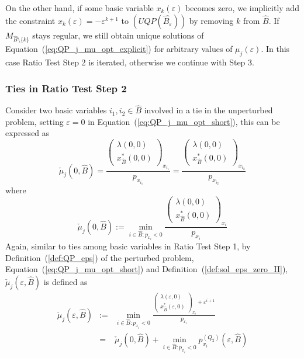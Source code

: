 \documentclass[a4paper]{article}
\newcommand{\xe}[1]{\ensuremath{x_{#1}(\varepsilon)}}
\begin{document}
On the other hand, if some basic variable \xe{k} becomes zero, we
implicitly add the constraint $\xe{k}=-\varepsilon^{k+1}$ to
$(UQP(\hat{B_{\varepsilon}}))$ by removing $k$ from $\hat{B}$. If
$M_{\hat{B} \setminus \{k\}}$ stays regular, we still obtain unique solutions
of Equation~(\ref{eq:QP_j_mu_opt_explicit}) for arbitrary values of
$\mu_{j}(\varepsilon)$. In this case Ratio Test Step 2 is iterated,
otherwise we continue with Step 3. 
 
\subsubsection{Ties in Ratio Test Step 2}
\label{sec:Ties_ratio_test_step_2}
Consider two basic variables $i_{1}, i_{2} \in \hat{B}$ involved in a tie in
the unperturbed problem, setting $\varepsilon=0$ in
Equation~(\ref{eq:QP_j_mu_opt_short}), this can be expressed as 
\begin{equation}
\check{\mu}_{j}(0, \hat{B}) =
\frac{\left(\begin{array}{c}
              \lambda\left(0,0\right) \\
              \hline
               x_{\hat{B}}^{*}\left(0,0\right)
            \end{array}
      \right)_{x_{i_{1}}}}{p_{x_{i_{1}}}}
=
\frac{\left(\begin{array}{c}
              \lambda\left(0,0\right) \\
              \hline
              x_{\hat{B}}^{*}\left(0,0\right) 
            \end{array}
       \right)_{x_{i_{2}}}}{p_{x_{i_{2}}}}
\end{equation}
where
\begin{equation}
\label{def:hat_mu_j_min_0}
  \check{\mu}_{j}(0, \hat{B}) :=
  \min_{i \in \hat{B}: p_{x_{i}} < 0}
  \frac{\left(\begin{array}{c}
                \lambda\left(0,0\right) \\
	        \hline
	        x_{\hat{B}}^{*}\left(0,0\right)
	       \end{array}
         \right)_{x_{i}}}{p_{x_{i}}} 
\end{equation}
Again, similar to ties among basic variables in Ratio Test Step 1,
by Definition~(\ref{def:QP_eps}) of the perturbed problem,
Equation~(\ref{eq:QP_j_mu_opt_short}) and
Definition~(\ref{def:sol_eps_zero_II}),
$\check{\mu}_{j}(\varepsilon, \hat{B})$ is defined as
\begin{eqnarray}
\label{def:hat_mu_j_min_eps}
\check{\mu}_{j}(\varepsilon, \hat{B}) & := &
  \min_{i \in \hat{B}: p_{x_{i}} < 0}
  \frac{\left(\begin{array}{c}
                \lambda\left(\varepsilon, 0\right) \\
	        \hline
	        x_{\hat{B}}^{*}\left(\varepsilon,0\right)
	      \end{array}
        \right)_{x_{i}}+ \varepsilon^{i+1}}{p_{x_{i}}} \\
  &=&
  \check{\mu}_{j}(0, \hat{B}) +
  \min_{i \in \hat{B}: p_{x_{i}} < 0} p_{x_{i}}^{(Q_{2})}
  (\varepsilon, \hat{B})
\end{eqnarray}
\end{document}
